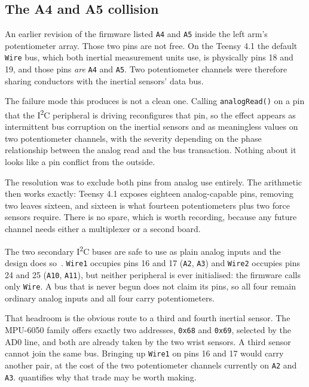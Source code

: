 \subsection{The A4 and A5 collision}

An earlier revision of the firmware listed \texttt{A4} and \texttt{A5} inside
the left arm's potentiometer array. Those two pins are not free. On the Teensy
4.1 the default \texttt{Wire} bus, which both inertial measurement units use,
is physically pins 18 and 19, and those pins \emph{are} \texttt{A4} and
\texttt{A5}. Two potentiometer channels were therefore sharing conductors with
the inertial sensors' data bus.

The failure mode this produces is not a clean one. Calling
\texttt{analogRead()} on a pin that the I\textsuperscript{2}C peripheral is
driving reconfigures that pin, so the effect appears as intermittent bus
corruption on the inertial sensors and as meaningless values on two
potentiometer channels, with the severity depending on the phase relationship
between the analog read and the bus transaction. Nothing about it looks like a
pin conflict from the outside.

The resolution was to exclude both pins from analog use entirely. The
arithmetic then works exactly: Teensy 4.1 exposes eighteen analog-capable
pins, removing two leaves sixteen, and sixteen is what fourteen potentiometers
plus two force sensors require. There is no spare, which is worth recording,
because any future channel needs either a multiplexer or a second board.

The two secondary I\textsuperscript{2}C buses are safe to use as plain analog
inputs and the design does so~\cite{pjrc2020teensy41}. \texttt{Wire1} occupies pins 16 and 17
(\texttt{A2}, \texttt{A3}) and \texttt{Wire2} occupies pins 24 and 25
(\texttt{A10}, \texttt{A11}), but neither peripheral is ever initialised: the
firmware calls only \texttt{Wire}. A bus that is never begun does not claim
its pins, so all four remain ordinary analog inputs and all four carry
potentiometers.

That headroom is the obvious route to a third and fourth inertial sensor. The
MPU-6050 family offers exactly two addresses, \texttt{0x68} and \texttt{0x69},
selected by the AD0 line, and both are already taken by the two wrist sensors.
A third sensor cannot join the same bus. Bringing up \texttt{Wire1} on pins 16
and 17 would carry another pair, at the cost of the two potentiometer channels
currently on \texttt{A2} and \texttt{A3}.  quantifies why
that trade may be worth making.

